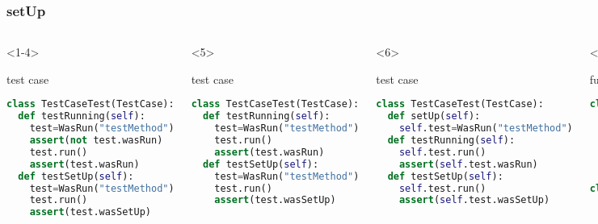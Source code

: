 \documentclass[lualatex]{beamer}
\begin{document}
\begin{frame}[fragile,t]
    \frametitle{setUp}

    \begin{columns}[t]
        \small
        \begin{onlyenv}<1-4>
            \begin{block}{test case}
                \begin{lstlisting}[language=Python,columns=fullflexible]
class TestCaseTest(TestCase):
  def testRunning(self):
    test=WasRun("testMethod")
    assert(not test.wasRun)
    test.run()
    assert(test.wasRun)
  def testSetUp(self):
    test=WasRun("testMethod")
    test.run()
    assert(test.wasSetUp)
                \end{lstlisting}
            \end{block}
        \end{onlyenv}

        \begin{onlyenv}<5>
            \begin{block}{test case}
                \begin{lstlisting}[language=Python,columns=fullflexible]
class TestCaseTest(TestCase):
  def testRunning(self):
    test=WasRun("testMethod")
    test.run()
    assert(test.wasRun)
  def testSetUp(self):
    test=WasRun("testMethod")
    test.run()
    assert(test.wasSetUp)
                \end{lstlisting}
            \end{block}
        \end{onlyenv}

        \begin{onlyenv}<6>
            \begin{block}{test case}
                \begin{lstlisting}[language=Python,columns=fullflexible]
class TestCaseTest(TestCase):
  def setUp(self):
    self.test=WasRun("testMethod")
  def testRunning(self):
    self.test.run()
    assert(self.test.wasRun)
  def testSetUp(self):
    self.test.run()
    assert(self.test.wasSetUp)
                \end{lstlisting}
            \end{block}
        \end{onlyenv}

        \begin{onlyenv}<2>
            \begin{block}{functional codes}
                \begin{lstlisting}[language=Python,columns=fullflexible]
class TestCase:
  def setUp(self):
    pass
  def run(self):
    self.setUp()
    method=getattr(self, self.name)
    method()
class WasRun:
  def setUp(self):
    self.wasSetUp = 1
                \end{lstlisting}
            \end{block}
        \end{onlyenv}


\end{columns}
\end{frame}
\end{document}
